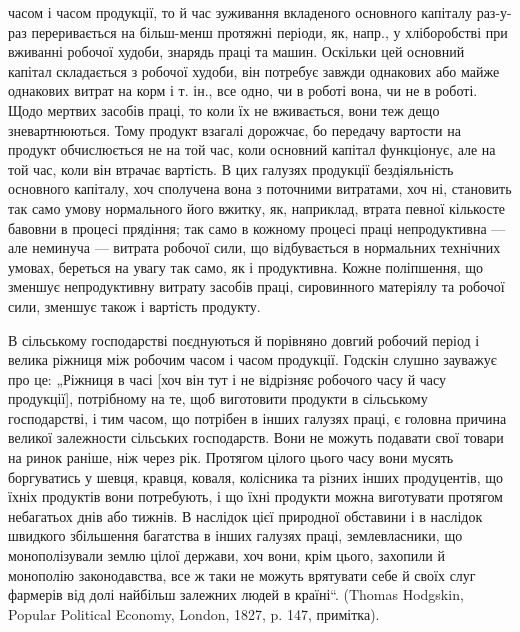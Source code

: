 \parcont{}  %
часом і часом продукції, то й час зуживання вкладеного основного капіталу раз-у-раз переривається на
більш-менш протяжні періоди, як, напр., у хліборобстві при вживанні робочої худоби, знарядь праці та
машин. Оскільки цей основний капітал складається з робочої худоби, він потребує завжди однакових або
майже однакових витрат на корм і т. ін., все одно, чи в роботі вона, чи не в роботі. Щодо мертвих
засобів праці, то коли їх не вживається, вони теж дещо зневартнюються. Тому продукт взагалі
дорожчає, бо передачу вартости на продукт обчислюється не на той час, коли основний капітал
функціонує, але на той час, коли він втрачає вартість. В цих галузях продукції бездіяльність
основного капіталу, хоч сполучена вона з поточними витратами, хоч ні, становить так само умову
нормального його вжитку, як, наприклад, втрата певної кількосте бавовни в процесі прядіння; так само
в кожному процесі праці непродуктивна — але неминуча — витрата робочої сили, що відбувається в
нормальних технічних умовах, береться на увагу так само, як і продуктивна. Кожне поліпшення, що
зменшує непродуктивну витрату засобів праці, сировинного матеріялу та робочої сили, зменшує також і
вартість продукту.

В сільському господарстві поєднуються й порівняно довгий робочий період і велика ріжниця між робочим
часом і часом продукції. Годскін слушно зауважує про це: „Ріжниця в часі [хоч він тут і не відрізняє
робочого часу й часу продукції], потрібному на те, щоб виготовити продукти в сільському
господарстві, і тим часом, що потрібен в інших галузях праці, є головна причина великої залежности
сільських господарств. Вони не можуть подавати свої товари на ринок раніше, ніж через рік. Протягом
цілого цього часу вони мусять боргуватись у шевця, кравця, коваля, колісника та різних інших
продуцентів, що їхніх продуктів вони потребують, і що їхні продукти можна виготувати протягом
небагатьох днів або тижнів. В наслідок цієї природної обставини і в наслідок швидкого збільшення
багатства в інших галузях праці, землевласники, що монополізували землю цілої держави, хоч вони,
крім цього, захопили й монополію законодавства, все ж таки не можуть врятувати себе й своїх слуг
фармерів від долі найбільш залежних людей в країні“. (Thomas Hodgskin, Popular Political Economy,
London, 1827, p. 147, примітка).

